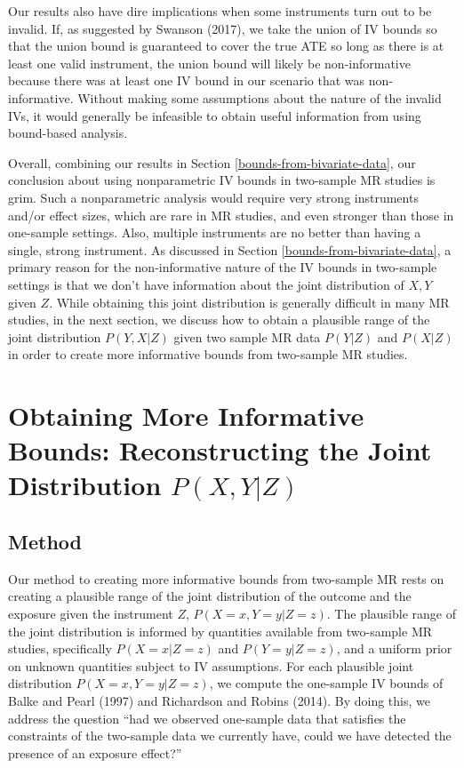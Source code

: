 \documentclass[
]{article}
\theoremstyle{plain}
\begin{document}
Our results also have dire implications when some instruments turn out to be invalid. If, as suggested by Swanson (2017), we take the union of IV bounds so that the union bound is guaranteed to cover the true ATE so long as there is at least one valid instrument, the union bound will likely be non-informative because there was at least one IV bound in our scenario that was non-informative. Without making some assumptions about the nature of the invalid IVs, it would generally be infeasible to obtain useful information from using bound-based analysis.

Overall, combining our results in Section \ref{bounds-from-bivariate-data}, our conclusion about using nonparametric IV bounds in two-sample MR studies is grim. Such a nonparametric analysis would require very strong instruments and/or effect sizes, which are rare in MR studies, and even stronger than those in one-sample settings. Also, multiple instruments are no better than having a single, strong instrument. As discussed in Section \ref{bounds-from-bivariate-data}, a primary reason for the non-informative nature of the IV bounds in two-sample settings is that we don't have information about the joint distribution of \(X,Y\) given \(Z\). While obtaining this joint distribution is generally difficult in many MR studies, in the next section, we discuss how to obtain a plausible range of the joint distribution \(P(Y, X | Z)\) given two sample MR data \(P(Y|Z)\) and \(P(X | Z)\) in order to create more informative bounds from two-sample MR studies.

\hypertarget{obtaining-more-informative-bounds-reconstructing-the-joint-distribution-pxy-z}{%
\section{\texorpdfstring{Obtaining More Informative Bounds: Reconstructing the Joint Distribution \(P(X,Y | Z)\)}{Obtaining More Informative Bounds: Reconstructing the Joint Distribution P(X,Y \textbar{} Z)}}\label{obtaining-more-informative-bounds-reconstructing-the-joint-distribution-pxy-z}}

\label{quasi-bayesian}

\hypertarget{method}{%
\subsection{Method}\label{method}}

Our method to creating more informative bounds from two-sample MR rests on creating a plausible range of the joint distribution of the outcome and the exposure given the instrument \(Z\), \(P(X = x, Y = y | Z = z)\). The plausible range of the joint distribution is informed by quantities available from two-sample MR studies, specifically \(P(X = x | Z = z)\) and \(P(Y = y | Z = z)\), and a uniform prior on unknown quantities subject to IV assumptions. For each plausible joint distribution \(P(X = x, Y = y | Z = z)\), we compute the one-sample IV bounds of Balke and Pearl (1997) and Richardson and Robins (2014). By doing this, we address the question ``had we observed one-sample data that satisfies the constraints of the two-sample data we currently have, could we have detected the presence of an exposure effect?''
\end{document}
